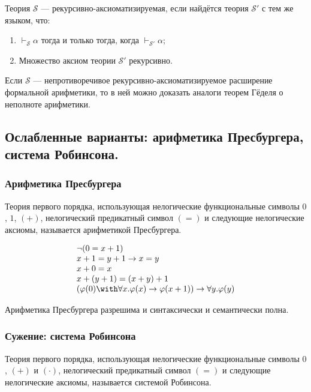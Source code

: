 \documentclass[10pt,a4paper,oneside]{article}
\begin{document}
 Теория $\mathcal{S}$ --- рекурсивно-аксиоматизируемая, если найдётся теория $\mathcal{S'}$ с тем же языком, что:
\begin{enumerate}
\item $\vdash_\mathcal{S} \alpha$ тогда и только тогда, когда $\vdash_\mathcal{S'} \alpha$;
\item Множество аксиом теории $\mathcal{S'}$ рекурсивно.
\end{enumerate}

 Если $\mathcal{S}$ --- непротиворечивое рекурсивно-аксиоматизируемое расширение формальной арифметики, то
в ней можно доказать аналоги теорем Гёделя о неполноте арифметики.

\subsection{Ослабленные варианты: арифметика Пресбургера, система Робинсона.}

\subsubsection{Арифметика Пресбургера}
 Теория первого порядка, использующая нелогические функциональные символы $0$, $1$, $(+)$, нелогический
предикатный символ $(=)$ и следующие нелогические аксиомы, называется арифметикой Пресбургера.

$$\begin{array}{l}
\neg (0 = x + 1) \\
x + 1 = y + 1 \rightarrow x = y\\
x + 0 = x \\
x + (y + 1) = (x + y) + 1\\
(\varphi(0) \with \forall x.\varphi(x) \rightarrow \varphi(x+1)) \rightarrow \forall y.\varphi(y)
\end{array}$$

 Арифметика Пресбургера разрешима и синтаксически и семантически полна.

\subsubsection{Сужение: система Робинсона}
 Теория первого порядка, использующая нелогические функциональные символы $0$, $(+)$ и $(\cdot)$, нелогический
предикатный символ $(=)$ и следующие нелогические аксиомы, называется системой Робинсона.
\end{document}
